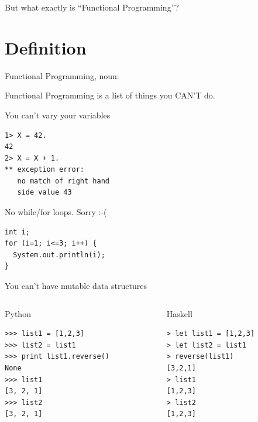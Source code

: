 \documentclass[mathserif]{beamer}
\begin{document}
\begin{frame}

  \begin{center}
  {\Huge But what exactly is ``Functional Programming''?}
  \end{center}

\end{frame}

\section{Definition}

\begin{frame}{Functional Programming, noun:}

  \begin{exampleblock}{}
    {\Huge
      Functional Programming is a list of things you CAN’T do.
      }
    \vskip5mm
    \hspace*{}
  \end{exampleblock}
\end{frame}


\begin{frame}[fragile]{You can't vary your variables}
  \begin{verbatim}
1> X = 42.
42
2> X = X + 1.
** exception error:
   no match of right hand
   side value 43
  \end{verbatim}
\end{frame}

\begin{frame}[fragile]{No while/for loops. Sorry :-(}
  \begin{verbatim}
int i;
for (i=1; i<=3; i++) {
  System.out.println(i);
}
  \end{verbatim}
\end{frame}

\begin{frame}[fragile]{You can't have mutable data structures}
     \begin{columns}[t]
     \begin{column}[T]{5cm}
Python
\begin{verbatim}
>>> list1 = [1,2,3]
>>> list2 = list1
>>> print list1.reverse()
None
>>> list1
[3, 2, 1]
>>> list2
[3, 2, 1]
\end{verbatim}
     \end{column}

     \begin{column}[T]{5cm}
Haskell
\begin{verbatim}
> let list1 = [1,2,3]
> let list2 = list1
> reverse(list1)
[3,2,1]
> list1
[1,2,3]
> list2
[1,2,3]
\end{verbatim}
     \end{column}
     \end{columns}
\end{frame}
\end{document}
